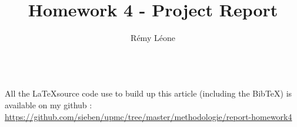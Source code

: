 \documentclass{sig-alternate}
\newcommand{\BibTeX}{{\sc Bib}\TeX}
\begin{document}
\title{Homework 4 - Project Report}


\author
{
  \alignauthor
    Rémy Léone\\
    \\
}

\maketitle














\appendix
\makeatletter
\def\@seccntformat#1{Appendix~\csname the#1\endcsname:\quad}
\makeatother

All the \LaTeX source code use to build up this 
article (including the \BibTeX) is available on my github :
\href{https://github.com/sieben/upmc/tree/master/methodologie/report-homework4}
{https://github.com/sieben/upmc/tree/master/methodologie/report-homework4}

%
\end{document}
